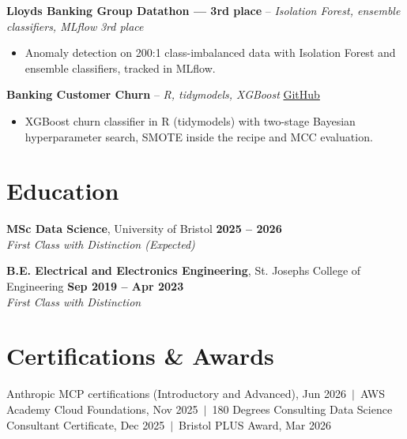 \documentclass[a4paper,11pt]{article}
\begin{document}
\noindent\textbf{Lloyd\textquotesingle{}s Banking Group Datathon — 3rd place} -- \textit{Isolation Forest, ensemble classifiers, MLflow} \hfill \textit{3rd place}
\begin{itemize}
  \item Anomaly detection on 200:1 class-imbalanced data with Isolation Forest and ensemble classifiers, tracked in MLflow.
\end{itemize}
\vspace{3pt}
\noindent\textbf{Banking Customer Churn} -- \textit{R, tidymodels, XGBoost} \hfill \href{https://github.com/Thiruvel-AP/Banking-Customer-Churn-Prediction}{GitHub}
\begin{itemize}
  \item XGBoost churn classifier in R (tidymodels) with two-stage Bayesian hyperparameter search, SMOTE inside the recipe and MCC evaluation.
\end{itemize}

\section{Education}
\textbf{MSc Data Science}, University of Bristol \hfill \textbf{2025 – 2026}\\ \textit{First Class with Distinction (Expected)}\par
\vspace{3pt}
\textbf{B.E. Electrical and Electronics Engineering}, St. Joseph\textquotesingle{}s College of Engineering \hfill \textbf{Sep 2019 – Apr 2023}\\ \textit{First Class with Distinction}\par

\section{Certifications \& Awards}
Anthropic MCP certifications (Introductory and Advanced), Jun 2026 \,$|$\, AWS Academy Cloud Foundations, Nov 2025 \,$|$\, 180 Degrees Consulting Data Science Consultant Certificate, Dec 2025 \,$|$\, Bristol PLUS Award, Mar 2026
\end{document}
